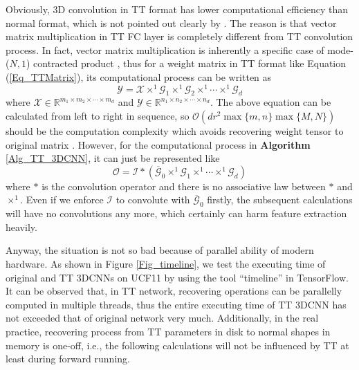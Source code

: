 \documentclass[a4paper,fleqn]{cas-dc}
\begin{document}
Obviously, 3D convolution in TT format has lower computational efficiency than normal format, which is not pointed out clearly by \citet{Garipov_2016_TTCNN}. The reason is that vector matrix multiplication in TT FC layer is completely different from TT convolution process. In fact, vector matrix multiplication is inherently a specific case of mode-(\(N,1\)) contracted product \citep{Lee_2018_TensorNetwork}, thus for a weight matrix in TT format like Equation (\ref{Eq_TTMatrix}), its computational process can be written as
\begin{equation*}
\bm{\mathcal{Y}} = \bm{\mathcal{X}} \times ^{1} \bm{\mathcal{G}}_{1} \times ^{1} \bm{\mathcal{G}}_{2} \times ^{1} \cdots \times ^{1} \bm{\mathcal{G}}_{d}
\end{equation*}
where \(\bm{\mathcal{X}} \in \mathbb{R} ^{m_1 \times m_2 \times \cdots \times m_d}\) and \(\bm{\mathcal{Y}} \in \mathbb{R} ^{n_1 \times n_2 \times \cdots \times n_d}\). The above equation can be calculated from left to right in sequence, so \(\mathcal{O}(dr^{2}\max{\{m,n\}}\max{\{M,N\}})\) should be the computation complexity which avoids recovering weight tensor to original matrix \citep{Novikov_2015_TT}. However, for the computational process in \textbf{Algorithm} \ref{Alg_TT_3DCNN}, it can just be represented like
\begin{equation*}
\bm{\mathcal{O}} = \bm{\mathcal{I}} * (\overline{\bm{\mathcal{G}}}_{0} \times ^{1} \bm{\mathcal{G}}_{1} \times ^{1} \cdots \times ^{1} \bm{\mathcal{G}}_{d})
\end{equation*}
where \(*\) is the convolution operator and there is no associative law between \(*\) and \(\times ^{1}\). Even if we enforce \(\bm{\mathcal{I}}\) to convolute with \(\overline{\bm{\mathcal{G}}}_{0}\) firstly, the subsequent calculations will have no convolutions any more, which certainly can harm feature extraction heavily.

Anyway, the situation is not so bad because of parallel ability of modern hardware. As shown in Figure \ref{Fig_timeline}, we test the executing time of original and TT 3DCNNs on UCF11 by using the tool ``timeline'' in TensorFlow. It can be observed that, in TT network, recovering operations can be parallelly computed in multiple threads, thus the entire executing time of TT 3DCNN has not exceeded that of original network very much. Additionally, in the real practice, recovering process from TT parameters in disk to normal shapes in memory is one-off, i.e., the following calculations will not be influenced by TT at least during forward running.
\end{document}
